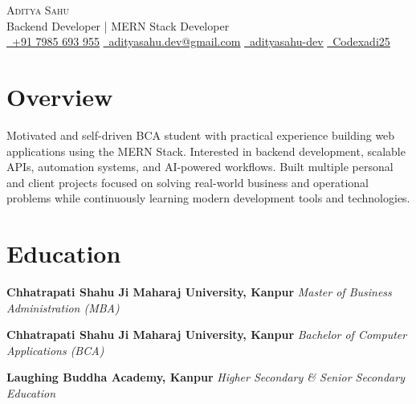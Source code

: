 \documentclass[a4paper,10pt]{article}
\begin{document}
\begin{center}
    {\Huge \scshape Aditya Sahu} \\[3pt]

    Backend Developer | MERN Stack Developer \\[5pt]

    \small
    \href{tel:+917985693955}{\faPhone\ \underline{+91 7985 693 955}}
    \hspace{5pt}
    \href{mailto:adityasahu.dev@gmail.com}{\faEnvelope\ \underline{adityasahu.dev@gmail.com}}
    \hspace{5pt}
    \href{https://linkedin.com/in/adityasahu-dev}{\faLinkedin\ \underline{adityasahu-dev}}
    \hspace{5pt}
    \href{https://github.com/Codexadi25}{\faGithub\ \underline{Codexadi25}}

\end{center}

\vspace{-6pt}

\section*{Overview}

Motivated and self-driven BCA student with practical experience building web applications using the MERN Stack. Interested in backend development, scalable APIs, automation systems, and AI-powered workflows. Built multiple personal and client projects focused on solving real-world business and operational problems while continuously learning modern development tools and technologies.

\vspace{-2pt}

\section*{Education}

\textbf{Chhatrapati Shahu Ji Maharaj University, Kanpur}
\hfill \textit{Master of Business Administration (MBA)}

\textbf{Chhatrapati Shahu Ji Maharaj University, Kanpur}
\hfill \textit{Bachelor of Computer Applications (BCA)}

\textbf{Laughing Buddha Academy, Kanpur}
\hfill \textit{Higher Secondary \& Senior Secondary Education}

\vspace{-2pt}
\end{document}
